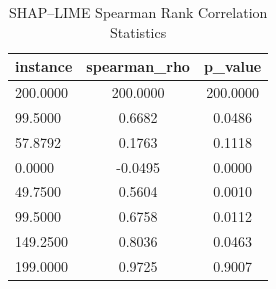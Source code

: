 \begin{table}
\centering
\caption{SHAP–LIME Spearman Rank Correlation Statistics}
\label{tab:agreement}
\begin{tabular}{lcc}
\toprule
instance & spearman_rho & p_value \\
\midrule
200.0000 & 200.0000 & 200.0000 \\
99.5000 & 0.6682 & 0.0486 \\
57.8792 & 0.1763 & 0.1118 \\
0.0000 & -0.0495 & 0.0000 \\
49.7500 & 0.5604 & 0.0010 \\
99.5000 & 0.6758 & 0.0112 \\
149.2500 & 0.8036 & 0.0463 \\
199.0000 & 0.9725 & 0.9007 \\
\bottomrule
\end{tabular}
\end{table}
